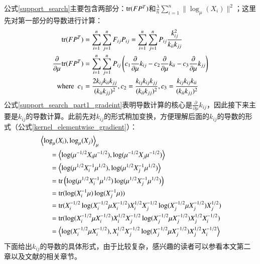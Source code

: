 公式\ref{support_search}主要包含两部分：${\rm tr}(FP^{T})$和$\frac{\lambda}{n}\sum_{i=1}^{n} \|\log_{\mu}(X_i)\|^2$；这里先对第一部分的导数进行计算：
\begin{equation}
\label{support_search_part1_gradeint}
\begin{split}
{\rm tr}(FP^{T})&=\sum_{i=1}^{n}\sum_{j=1}^{n}F_{ij}P_{ij}=\sum_{i=1}^{n}\sum_{j=1}^{n}P_{ij}\frac{k_{ij}^2}{k_{ii}k_{jj}}\\
\frac{\partial}{\partial \mu}{\rm tr}(FP^{T})&=\sum_{i=1}^{n}\sum_{j=1}^{n}P_{ij}\left(c_1\frac{\partial}{\partial \mu}k_{ij}-c_2\frac{\partial}{\partial \mu}k_{ii}-c_3\frac{\partial}{\partial \mu}k_{jj}\right)\\
{\rm where~~}c_1&=\frac{2k_{ij}k_{ii}k_{jj}}{(k_{ii}k_{jj})^2},c_2=\frac{k_{ij}k_{ij}k_{jj}}{(k_{ii}k_{jj})^2},c_3=\frac{k_{ij}k_{ij}k_{ii}}{(k_{ii}k_{jj})^2}
\end{split}
\end{equation}
公式\ref{support_search_part1_gradeint}表明导数计算的核心是$\frac{\partial}{\partial \mu}k_{ij}$，因此接下来主要是$k_{ij}$的导数计算。此前先对$k_{ij}$的形式稍加变换，方便理解后面的$k_{ij}$的导数的形式（公式\ref{kernel_elementwise_gradient}）：
\begin{equation}
\label{kernel_elementwise}
\begin{split}
&\left<\log_{\mu}(X_i),\log_{\mu}(X_j)\right>_{\mu}\\
&~~~~~~=\left<\log(\mu^{-1/2}X_{i}\mu^{-1/2}),\log(\mu^{-1/2}X_j\mu^{-1/2})\right>\\
&~~~~~~=\left<\log(\mu^{1/2}X_{i}^{-1}\mu^{1/2}),\log(\mu^{1/2}X_{j}^{-1}\mu^{1/2})\right>\\
&~~~~~~={\rm tr}\left(\log(\mu^{1/2}X_{i}^{-1}\mu^{1/2})\log(\mu^{1/2}X_{j}^{-1}\mu^{1/2})\right)\\
&~~~~~~={\rm tr}(\log(X_{i}^{-1}\mu)\log(X_{j}^{-1}\mu))\\
&~~~~~~={\rm tr}(X_{i}^{-1/2}\log(X_{i}^{-1/2}\mu X_{i}^{-1/2})X_{i}^{1/2}X_{j}^{-1/2}\log(X_{j}^{-1/2}\mu X_{j}^{-1/2})X_{j}^{1/2})\\
&~~~~~~={\rm tr}(\log(X_{i}^{-1/2}\mu X_{i}^{-1/2})X_{i}^{1/2}X_{j}^{-1/2}\log(X_{j}^{-1/2}\mu X_{j}^{-1/2})X_{j}^{1/2}X_{i}^{-1/2})\\
&~~~~~~=\left<\log(X_{i}^{-1/2}\mu X_{i}^{-1/2}),X_{i}^{1/2}X_{j}^{-1/2}\log(X_{j}^{-1/2}\mu X_{j}^{-1/2})X_{j}^{1/2}X_{i}^{-1/2}\right>\\
\end{split}
\end{equation}
下面给出$k_{ij}$的导数的具体形式，由于比较复杂，感兴趣的读者可以参看本文第二章以及文献\cite{Maniopt_DiscreteCurveFitting,Statistics_SLEDML}的相关章节。
